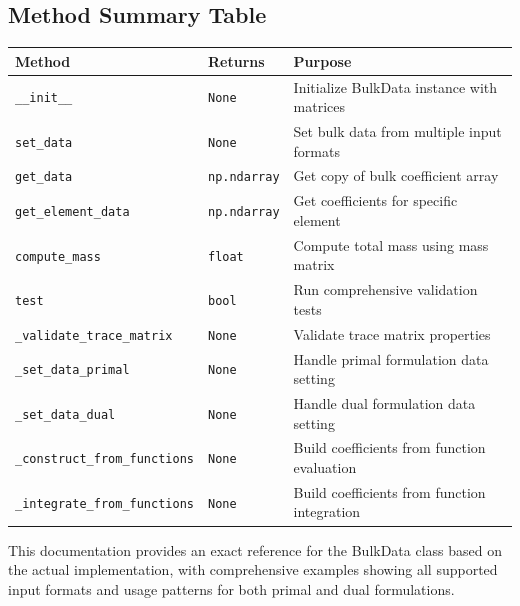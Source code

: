 \subsection{Method Summary Table}
\label{subsec:bulk_data_method_summary}

\begin{longtable}{|p{5cm}|p{2cm}|p{7cm}|}
\hline
\textbf{Method} & \textbf{Returns} & \textbf{Purpose} \\
\hline
\endhead

\texttt{\_\_init\_\_} & \texttt{None} & Initialize BulkData instance with matrices \\
\hline

\texttt{set\_data} & \texttt{None} & Set bulk data from multiple input formats \\
\hline

\texttt{get\_data} & \texttt{np.ndarray} & Get copy of bulk coefficient array \\
\hline

\texttt{get\_element\_data} & \texttt{np.ndarray} & Get coefficients for specific element \\
\hline

\texttt{compute\_mass} & \texttt{float} & Compute total mass using mass matrix \\
\hline

\texttt{test} & \texttt{bool} & Run comprehensive validation tests \\
\hline

\texttt{\_validate\_trace\_matrix} & \texttt{None} & Validate trace matrix properties \\
\hline

\texttt{\_set\_data\_primal} & \texttt{None} & Handle primal formulation data setting \\
\hline

\texttt{\_set\_data\_dual} & \texttt{None} & Handle dual formulation data setting \\
\hline

\texttt{\_construct\_from\_functions} & \texttt{None} & Build coefficients from function evaluation \\
\hline

\texttt{\_integrate\_from\_functions} & \texttt{None} & Build coefficients from function integration \\
\hline

\end{longtable}

This documentation provides an exact reference for the BulkData class based on the actual implementation, with comprehensive examples showing all supported input formats and usage patterns for both primal and dual formulations.

